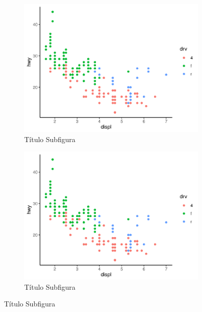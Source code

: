 \lipsum[1]

\begin{figure}[h]
	\caption{Exemplo Com Duas Subfiguras}
	\begin{subfigure}[t]{0.5\textwidth}
		\caption{Título Subfigura}
		\includegraphics[width=\linewidth]{fig/plot}
	\end{subfigure}
	\begin{subfigure}[t]{0.5\textwidth}
		\caption{Título Subfigura}
		\includegraphics[width=\linewidth]{fig/plot}
	\end{subfigure}
\end{figure}

\lipsum[1-5]


